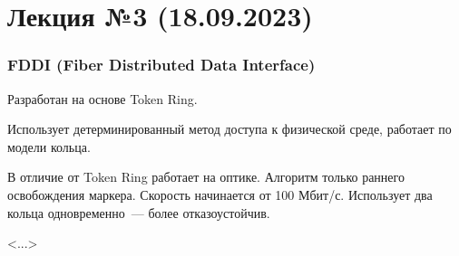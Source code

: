 \section{Лекция №3 (18.09.2023)}

\subsubsection{FDDI (Fiber Distributed Data Interface)}

Разработан на основе Token Ring.

Использует детерминированный метод доступа к физической среде, работает по модели кольца.

В отличие от Token Ring работает на оптике. Алгоритм только раннего освобождения маркера. Скорость начинается от 100 Мбит/с. Использует два кольца одновременно~--- более отказоустойчив.

<...>








